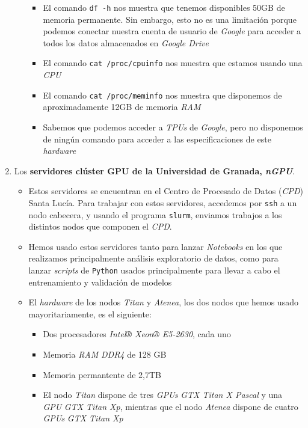 \begin{enumerate}
\begin{itemize}
                \begin{itemize}
                    \item El comando \lstinline{df -h} nos muestra que tenemos disponibles 50GB de memoria permanente. Sin embargo, esto no es una limitación porque podemos conectar nuestra cuenta de usuario de \textit{Google} para acceder a todos los datos almacenados en \textit{Google Drive}
                    \item El comando \lstinline{cat /proc/cpuinfo} nos muestra que estamos usando una \textit{CPU} 
                    \item El comando \lstinline{cat /proc/meminfo} nos muestra que disponemos de aproximadamente 12GB de memoria \textit{RAM}
                    \item Sabemos que podemos acceder a \textit{TPUs} de \textit{Google}, pero no disponemos de ningún comando para acceder a las especificaciones de este \textit{hardware}
                \end{itemize}
        \end{itemize}

    \item Los \textbf{servidores clúster GPU de la Universidad de Granada, \textit{nGPU}}.
        \begin{itemize}
            \item Estos servidores se encuentran en el Centro de Procesado de Datos (\textit{CPD}) Santa Lucía. Para trabajar con estos servidores, accedemos por \lstinline{ssh} a un nodo cabecera, y usando el programa \lstinline{slurm}, enviamos trabajos a los distintos nodos que componen el \textit{CPD}.
            \item Hemos usado estos servidores tanto para lanzar \textit{Notebooks} en los que realizamos principalmente análisis exploratorio de datos, como para lanzar \textit{scripts} de \lstinline{Python} usados principalmente para llevar a cabo el entrenamiento y validación de modelos
            \item El \textit{hardware} de los nodos \textit{Titan} y \textit{Atenea}, los dos nodos que hemos usado mayoritariamente, es el siguiente:
                \begin{itemize}
                    \item Dos procesadores \textit{Intel® Xeon® E5-2630}, cada uno
                    \item Memoria \textit{RAM} \textit{DDR4} de 128 GB
                    \item Memoria permantente de 2,7TB
                    \item El nodo \textit{Titan} dispone de tres \textit{GPUs} \textit{GTX Titan X Pascal} y una \textit{GPU} \textit{GTX Titan Xp}, mientras que el nodo \textit{Atenea} dispone de cuatro \textit{GPUs} \textit{GTX Titan Xp}
                \end{itemize}
        \end{itemize}

\end{enumerate}

